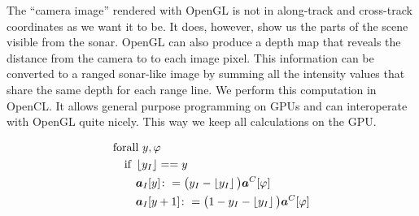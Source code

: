 The ``camera image'' rendered with OpenGL is not in along-track and cross-track coordinates as we want it to be. It does, however, show us the parts of the scene visible from the sonar. OpenGL can also produce a depth map that reveals the distance from the camera to to each image pixel. This information can be converted to a ranged sonar-like image by summing all the intensity values that share the same depth for each range line. We perform this computation in OpenCL. It allows general purpose programming on GPUs and can interoperate with OpenGL quite nicely. This way we keep all calculations on the GPU.

\begin{align}
&\text{forall } y,\varphi \nonumber\\
&\quad\text{if }\left\lfloor y_I\right\rfloor == y \nonumber\\
&\qquad\boldsymbol{a}_I[y] \colon= \big(y_I - \left\lfloor y_I\right\rfloor\big)\boldsymbol{a}^C[\varphi] \nonumber\\
&\qquad\boldsymbol{a}_I[y+1] \colon= \big(1 - y_I - \left\lfloor y_I\right\rfloor\big)\boldsymbol{a}^C[\varphi]
\end{align}



